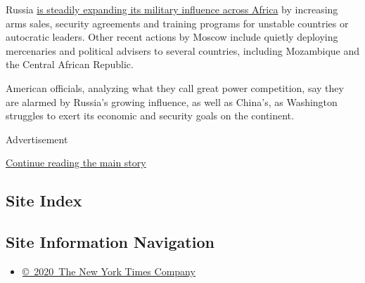 Russia
\href{https://www.nytimes3xbfgragh.onion/2020/01/28/world/africa/russia-africa-troops.html}{is
steadily expanding its military influence across Africa} by increasing
arms sales, security agreements and training programs for unstable
countries or autocratic leaders. Other recent actions by Moscow include
quietly deploying mercenaries and political advisers to several
countries, including Mozambique and the Central African Republic.

American officials, analyzing what they call great power competition,
say they are alarmed by Russia's growing influence, as well as China's,
as Washington struggles to exert its economic and security goals on the
continent.

Advertisement

\protect\hyperlink{after-bottom}{Continue reading the main story}

\hypertarget{site-index}{%
\subsection{Site Index}\label{site-index}}

\hypertarget{site-information-navigation}{%
\subsection{Site Information
Navigation}\label{site-information-navigation}}

\begin{itemize}
\tightlist
\item
  \href{https://help.nytimes3xbfgragh.onion/hc/en-us/articles/115014792127-Copyright-notice}{©~2020~The
  New York Times Company}
\end{itemize}

